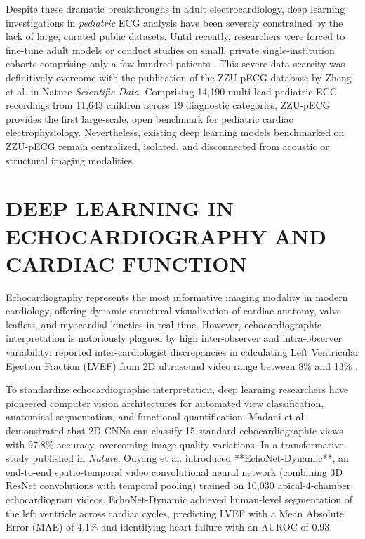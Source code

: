 \documentclass[12pt,a4paper]{amritareport}
\begin{document}
Despite these dramatic breakthroughs in adult electrocardiology, deep learning investigations in \textit{pediatric} ECG analysis have been severely constrained by the lack of large, curated public datasets. Until recently, researchers were forced to fine-tune adult models or conduct studies on small, private single-institution cohorts comprising only a few hundred patients \cite{kashou2020electrocardiogram}. This severe data scarcity was definitively overcome with the publication of the ZZU-pECG database by Zheng et al. \cite{zheng2025zzu} in Nature \textit{Scientific Data}. Comprising 14,190 multi-lead pediatric ECG recordings from 11,643 children across 19 diagnostic categories, ZZU-pECG provides the first large-scale, open benchmark for pediatric cardiac electrophysiology. Nevertheless, existing deep learning models benchmarked on ZZU-pECG remain centralized, isolated, and disconnected from acoustic or structural imaging modalities.


\section{DEEP LEARNING IN ECHOCARDIOGRAPHY AND CARDIAC FUNCTION}

Echocardiography represents the most informative imaging modality in modern cardiology, offering dynamic structural visualization of cardiac anatomy, valve leaflets, and myocardial kinetics in real time. However, echocardiographic interpretation is notoriously plagued by high inter-observer and intra-observer variability: reported inter-cardiologist discrepancies in calculating Left Ventricular Ejection Fraction (LVEF) from 2D ultrasound video range between 8\% and 13\% \cite{lang2015recommendations}.

To standardize echocardiographic interpretation, deep learning researchers have pioneered computer vision architectures for automated view classification, anatomical segmentation, and functional quantification. Madani et al. \cite{madani2018fast} demonstrated that 2D CNNs can classify 15 standard echocardiographic views with 97.8\% accuracy, overcoming image quality variations. In a transformative study published in \textit{Nature}, Ouyang et al. \cite{ouyang2020video} introduced **EchoNet-Dynamic**, an end-to-end spatio-temporal video convolutional neural network (combining 3D ResNet convolutions with temporal pooling) trained on 10,030 apical-4-chamber echocardiogram videos. EchoNet-Dynamic achieved human-level segmentation of the left ventricle across cardiac cycles, predicting LVEF with a Mean Absolute Error (MAE) of 4.1\% and identifying heart failure with an AUROC of 0.93.
\end{document}
